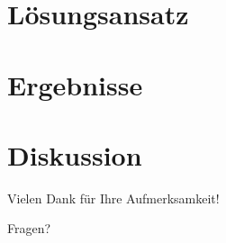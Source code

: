 \part{Lösungsansatz}
\label{part:solution}


\part{Ergebnisse}
\label{part:results}



\part{Diskussion}
\begin{frame}[fragile]{}
Vielen Dank für Ihre Aufmerksamkeit!

\vspace{1em}
\hspace{1em} Fragen?
\end{frame}
